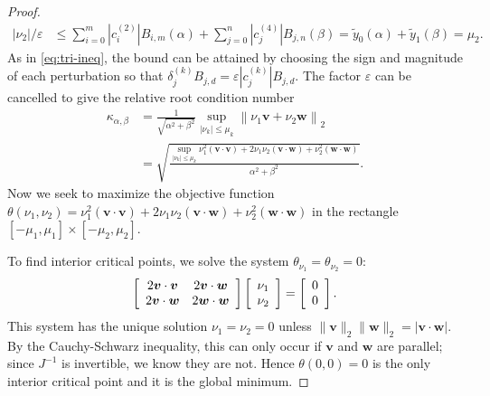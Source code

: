 \documentclass[3p, authoryear, square]{elsarticle}
\theoremstyle{definition}
\newcommand{\eps}{\varepsilon}
\begin{document}
\begin{proof}
\begin{align}
\left|\nu_2\right| / \eps &\leq \sum_{i = 0}^m
  \left|c_{i}^{(2)}\right| B_{i, m}\left(\alpha\right) + \sum_{j = 0}^n
  \left|c_{j}^{(4)}\right| B_{j, n}\left(\beta\right) =
  \widetilde{y}_0(\alpha) + \widetilde{y}_1(\beta) = \mu_2.
\end{align}
As in \eqref{eq:tri-ineq}, the bound can be attained by choosing the
sign and magnitude of each perturbation so that
\(\delta_j^{(k)} B_{j, d} = \eps \left|c_j^{(k)}\right| B_{j, d}\).
The factor \(\eps\) can be cancelled to give the relative root
condition number
\begin{align}
\kappa_{\alpha, \beta} &= \frac{1}{\sqrt{\alpha^2 + \beta^2}}
  \sup_{\left|\nu_k\right| \leq \mu_k} \left \lVert \nu_1 \bm{v} +
  \nu_2 \bm{w} \right \rVert_2 \\
  &=
  \sqrt{\frac{\sup_{\left|\nu_k\right| \leq \mu_k}
  \nu_1^2 \left(\bm{v} \cdot \bm{v}\right) +
  2 \nu_1 \nu_2 \left(\bm{v} \cdot \bm{w}\right) +
  \nu_2^2 \left(\bm{w} \cdot \bm{w}\right)}{\alpha^2 + \beta^2}}
  \label{eq:intersect-cond-num}.
\end{align}
Now we seek to maximize the objective function \(\theta(\nu_1, \nu_2) =
\nu_1^2 \left(\bm{v} \cdot \bm{v}\right) +
2 \nu_1 \nu_2 \left(\bm{v} \cdot \bm{w}\right) +
\nu_2^2 \left(\bm{w} \cdot \bm{w}\right)\) in the rectangle
\(\left[-\mu_1, \mu_1\right] \times \left[-\mu_2, \mu_2\right]\).

To find interior critical points, we solve the system \(\theta_{\nu_1} =
\theta_{\nu_2} = 0\):
\begin{equation}
\left[ \begin{array}{c c}
  2 \bm{v} \cdot \bm{v} & 2 \bm{v} \cdot \bm{w} \\
  2 \bm{v} \cdot \bm{w} & 2 \bm{w} \cdot \bm{w} \end{array}\right]
\left[ \begin{array}{c} \nu_1 \\ \nu_2 \end{array}\right] =
\left[ \begin{array}{c} 0 \\ 0 \end{array}\right].
\end{equation}
This system has the unique solution \(\nu_1 = \nu_2 = 0\) unless
\(\|\bm{v}\|_2 \|\bm{w}\|_2 = \left|\bm{v} \cdot \bm{w}\right|\).
By the Cauchy-Schwarz inequality, this can only occur if \(\bm{v}\) and
\(\bm{w}\) are parallel; since \(J^{-1}\) is invertible, we know they
are not. Hence \(\theta(0, 0) = 0\) is the only interior critical point and
it is the global minimum.


\end{proof}
\end{document}

